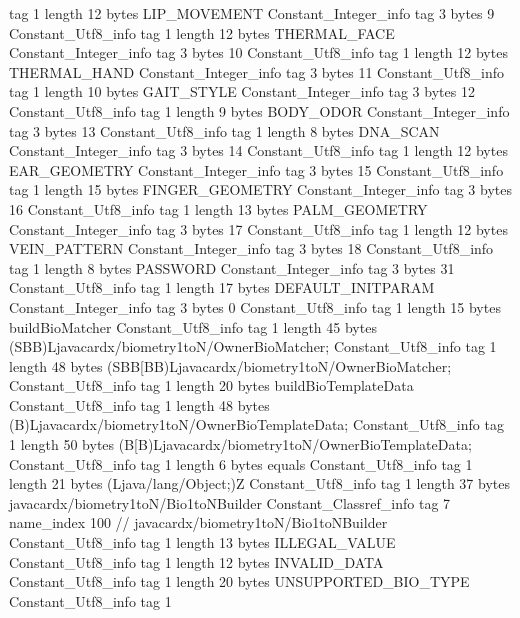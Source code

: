 {{{			tag	1
			length	12
			bytes	LIP_MOVEMENT
		}
		Constant_Integer_info {
			tag	3
			bytes	9
		}
		Constant_Utf8_info {
			tag	1
			length	12
			bytes	THERMAL_FACE
		}
		Constant_Integer_info {
			tag	3
			bytes	10
		}
		Constant_Utf8_info {
			tag	1
			length	12
			bytes	THERMAL_HAND
		}
		Constant_Integer_info {
			tag	3
			bytes	11
		}
		Constant_Utf8_info {
			tag	1
			length	10
			bytes	GAIT_STYLE
		}
		Constant_Integer_info {
			tag	3
			bytes	12
		}
		Constant_Utf8_info {
			tag	1
			length	9
			bytes	BODY_ODOR
		}
		Constant_Integer_info {
			tag	3
			bytes	13
		}
		Constant_Utf8_info {
			tag	1
			length	8
			bytes	DNA_SCAN
		}
		Constant_Integer_info {
			tag	3
			bytes	14
		}
		Constant_Utf8_info {
			tag	1
			length	12
			bytes	EAR_GEOMETRY
		}
		Constant_Integer_info {
			tag	3
			bytes	15
		}
		Constant_Utf8_info {
			tag	1
			length	15
			bytes	FINGER_GEOMETRY
		}
		Constant_Integer_info {
			tag	3
			bytes	16
		}
		Constant_Utf8_info {
			tag	1
			length	13
			bytes	PALM_GEOMETRY
		}
		Constant_Integer_info {
			tag	3
			bytes	17
		}
		Constant_Utf8_info {
			tag	1
			length	12
			bytes	VEIN_PATTERN
		}
		Constant_Integer_info {
			tag	3
			bytes	18
		}
		Constant_Utf8_info {
			tag	1
			length	8
			bytes	PASSWORD
		}
		Constant_Integer_info {
			tag	3
			bytes	31
		}
		Constant_Utf8_info {
			tag	1
			length	17
			bytes	DEFAULT_INITPARAM
		}
		Constant_Integer_info {
			tag	3
			bytes	0
		}
		Constant_Utf8_info {
			tag	1
			length	15
			bytes	buildBioMatcher
		}
		Constant_Utf8_info {
			tag	1
			length	45
			bytes	(SBB)Ljavacardx/biometry1toN/OwnerBioMatcher;
		}
		Constant_Utf8_info {
			tag	1
			length	48
			bytes	(SBB[BB)Ljavacardx/biometry1toN/OwnerBioMatcher;
		}
		Constant_Utf8_info {
			tag	1
			length	20
			bytes	buildBioTemplateData
		}
		Constant_Utf8_info {
			tag	1
			length	48
			bytes	(B)Ljavacardx/biometry1toN/OwnerBioTemplateData;
		}
		Constant_Utf8_info {
			tag	1
			length	50
			bytes	(B[B)Ljavacardx/biometry1toN/OwnerBioTemplateData;
		}
		Constant_Utf8_info {
			tag	1
			length	6
			bytes	equals
		}
		Constant_Utf8_info {
			tag	1
			length	21
			bytes	(Ljava/lang/Object;)Z
		}
		Constant_Utf8_info {
			tag	1
			length	37
			bytes	javacardx/biometry1toN/Bio1toNBuilder
		}
		Constant_Classref_info {
			tag	7
			name_index	100		// javacardx/biometry1toN/Bio1toNBuilder
		}
		Constant_Utf8_info {
			tag	1
			length	13
			bytes	ILLEGAL_VALUE
		}
		Constant_Utf8_info {
			tag	1
			length	12
			bytes	INVALID_DATA
		}
		Constant_Utf8_info {
			tag	1
			length	20
			bytes	UNSUPPORTED_BIO_TYPE
		}
		Constant_Utf8_info {
			tag	1
}}}
